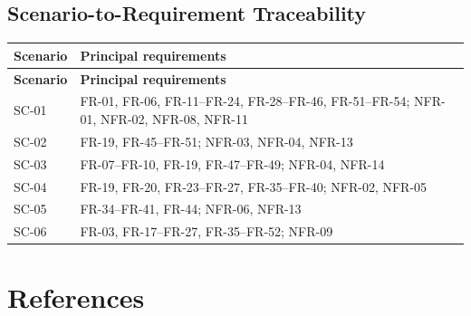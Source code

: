 \documentclass[11pt,a4paper,openany]{report}
\renewcommand{\arraystretch}{1.18}
\begin{document}
\section{Scenario-to-Requirement Traceability}
\begingroup
\small
\renewcommand{\arraystretch}{1.03}
\begin{longtable}{L{2cm} L{12.8cm}}
\toprule
\textbf{Scenario} & \textbf{Principal requirements}\\
\midrule
\endfirsthead
\toprule
\textbf{Scenario} & \textbf{Principal requirements}\\
\midrule
\endhead
SC-01 & FR-01, FR-06, FR-11--FR-24, FR-28--FR-46, FR-51--FR-54; NFR-01, NFR-02, NFR-08, NFR-11\\
SC-02 & FR-19, FR-45--FR-51; NFR-03, NFR-04, NFR-13\\
SC-03 & FR-07--FR-10, FR-19, FR-47--FR-49; NFR-04, NFR-14\\
SC-04 & FR-19, FR-20, FR-23--FR-27, FR-35--FR-40; NFR-02, NFR-05\\
SC-05 & FR-34--FR-41, FR-44; NFR-06, NFR-13\\
SC-06 & FR-03, FR-17--FR-27, FR-35--FR-52; NFR-09\\
\bottomrule
\end{longtable}
\endgroup

\chapter{References}
\label{chap:references}
\end{document}
